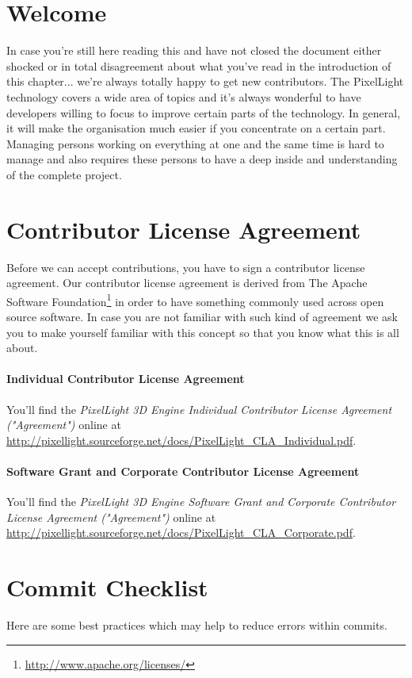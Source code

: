 \section{Welcome}
In case you're still here reading this and have not closed the document either shocked or in total disagreement about what you've read in the introduction of this chapter... we're always totally happy to get new contributors. The PixelLight technology covers a wide area of topics and it's always wonderful to have developers willing to focus to improve certain parts of the technology. In general, it will make the organisation much easier if you concentrate on a certain part. Managing persons working on everything at one and the same time is hard to manage and also requires these persons to have a deep inside and understanding of the complete project.





\section{Contributor License Agreement}
Before we can accept contributions, you have to sign a contributor license agreement. Our contributor license agreement is derived from The Apache Software Foundation\footnote{\url{http://www.apache.org/licenses/}} in order to have something commonly used across open source software. In case you are not familiar with such kind of agreement we ask you to make yourself familiar with this concept so that you know what this is all about.


\paragraph{Individual Contributor License Agreement}
You'll find the \emph{PixelLight 3D Engine Individual Contributor License Agreement ("Agreement")} online at \url{http://pixellight.sourceforge.net/docs/PixelLight_CLA_Individual.pdf}.


\paragraph{Software Grant and Corporate Contributor License Agreement}
You'll find the \emph{PixelLight 3D Engine Software Grant and Corporate Contributor License Agreement ("Agreement")} online at \url{http://pixellight.sourceforge.net/docs/PixelLight_CLA_Corporate.pdf}.




\section{Commit Checklist}
Here are some best practices which may help to reduce errors within commits.

